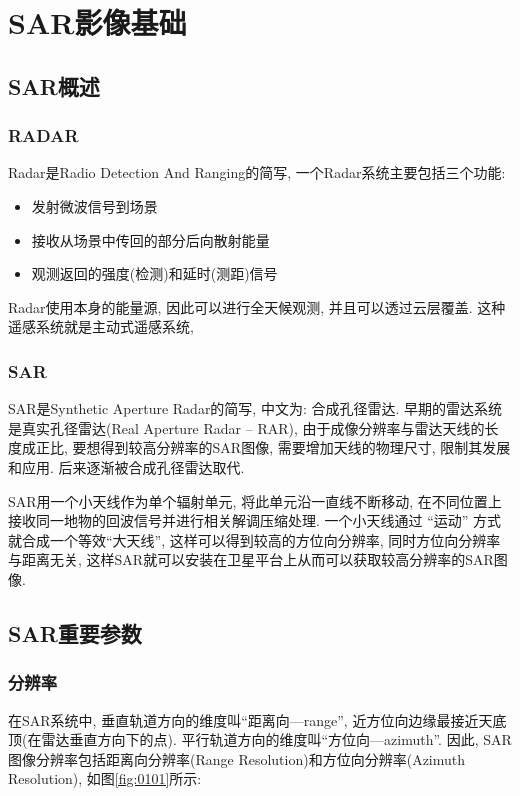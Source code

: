 \section{SAR影像基础}

\subsection{SAR概述}
\subsubsection{RADAR}
Radar是Radio Detection And Ranging的简写, 一个Radar系统主要包括三个功能:
\begin{itemize}
    \item 发射微波信号到场景
    \item 接收从场景中传回的部分后向散射能量
    \item 观测返回的强度(检测)和延时(测距)信号
\end{itemize}

Radar使用本身的能量源, 因此可以进行全天候观测, 并且可以透过云层覆盖. 这种遥感系统就是主动式遥感系统, 

\subsubsection{SAR}
SAR是Synthetic Aperture Radar的简写, 中文为: 合成孔径雷达. 早期的雷达系统是真实孔径雷达(Real Aperture Radar -- RAR), 由于成像分辨率与雷达天线的长度成正比, 要想得到较高分辨率的SAR图像, 需要增加天线的物理尺寸, 限制其发展和应用. 后来逐渐被合成孔径雷达取代. 

SAR用一个小天线作为单个辐射单元, 将此单元沿一直线不断移动, 在不同位置上接收同一地物的回波信号并进行相关解调压缩处理. 一个小天线通过 ``运动'' 方式就合成一个等效``大天线'', 这样可以得到较高的方位向分辨率, 同时方位向分辨率与距离无关, 这样SAR就可以安装在卫星平台上从而可以获取较高分辨率的SAR图像.

\subsection{SAR重要参数}
\subsubsection{分辨率}
在SAR系统中, 垂直轨道方向的维度叫``距离向—range'', 近方位向边缘最接近天底顶(在雷达垂直方向下的点). 平行轨道方向的维度叫``方位向—azimuth''. 因此, SAR图像分辨率包括距离向分辨率(Range Resolution)和方位向分辨率(Azimuth Resolution), 如图\ref{fig:0101}所示:

